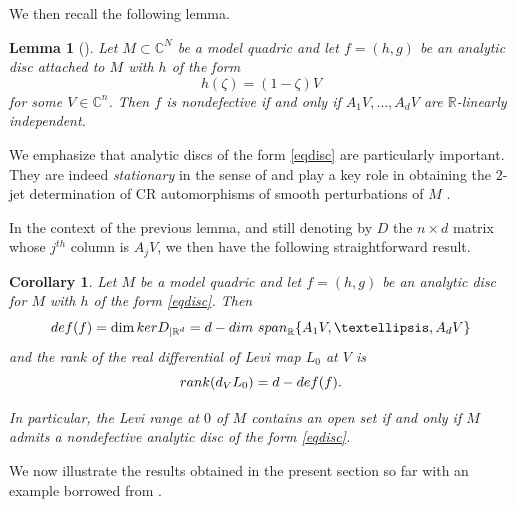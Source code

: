 \documentclass[10pt,a4paper]{amsart}
\newcommand{\C}{\mathbb C}
\newcommand{\R}{\mathbb R}
\newtheorem{lemma}[theo]{Lemma}
\newtheorem{cor}[theo]{Corollary}
\numberwithin{equation}{section}
\begin{document}
We then recall the following  lemma.
\begin{lemma}[\cite{be-me}]\label{lemclio}
Let $M \subset \C^N$ be a model quadric and let $f=(h,g)$ be an analytic disc attached to $M$ with $h$ of the form 
\begin{equation}\label{eqdisc}
h(\zeta)=(1-\zeta)V
\end{equation}
 for some $V \in \C^n$. Then $f$ is nondefective if and only if $A_1V,\ldots,A_dV$ are $\R$-linearly independent.
\end{lemma} 
We emphasize that analytic discs of the form \eqref{eqdisc} are particularly important. They are indeed {\it stationary} in the sense of \cite{le,tu} and  
play a key role in obtaining the $2$-jet determination of CR automorphisms of  smooth perturbations of $M$ \cite{be-bl-me,be-me,tu3}.  

In the context of the previous lemma, and still denoting by $D$ the $n\times d$ matrix whose $j^{th}$ column is $A_jV$, we then have the following straightforward result. 
\begin{cor}\label{cordisc}
Let  $M$ be a   model  quadric  and let $f=(h,g)$ be an analytic disc for $M$ with $h$ of the form \eqref{eqdisc}. Then  
$${\rm def}(f)=\dim {\rm ker}D_{|\R^d}=d-{\rm dim} \ {\rm span}_\R\{A_1V,\ldots,A_dV\}$$
and the rank of the real differential of Levi map $L_0$ at $V$ is  
$${\rm rank}(d_VL_0)=d - {\rm def}(f).$$ 

In particular, the Levi range at $0$ of $M$ contains an open set if and only if $M$ admits a nondefective analytic disc of the form \eqref{eqdisc}.   
\end{cor}

We now illustrate the results obtained in the present section so far with an example borrowed from \cite{gr-me}. 
\end{document}
